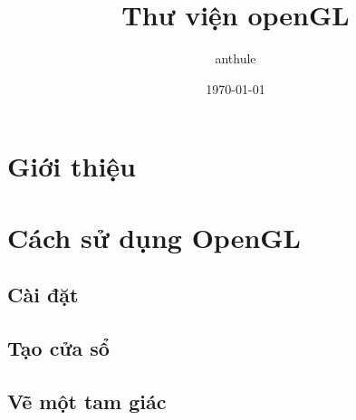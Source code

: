 \documentclass[12pt]{article}
\title{Thư viện openGL}
\author{anthule}
\date{\today}
\begin{document}

\tableofcontents
\maketitle
\section{Giới thiệu}

\section{Cách sử dụng OpenGL}
\subsection{Cài đặt}

\subsection{Tạo cửa sổ}

\subsection{Vẽ một tam giác}
\end{document}
